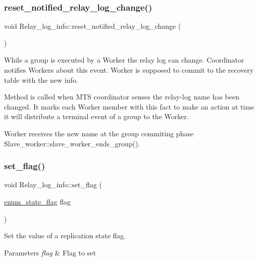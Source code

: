 \subsubsection{\texorpdfstring{reset\+\_\+notified\+\_\+relay\+\_\+log\+\_\+change()}{reset\_notified\_relay\_log\_change()}}
{\footnotesize\ttfamily void Relay\+\_\+log\+\_\+info\+::reset\+\_\+notified\+\_\+relay\+\_\+log\+\_\+change (\begin{DoxyParamCaption}{ }\end{DoxyParamCaption})}

While a group is executed by a Worker the relay log can change. Coordinator notifies Workers about this event. Worker is supposed to commit to the recovery table with the new info.

Method is called when M\+TS coordinator senses the relay-\/log name has been changed. It marks each Worker member with this fact to make an action at time it will distribute a terminal event of a group to the Worker.

Worker receives the new name at the group commiting phase {\ttfamily Slave\+\_\+worker\+::slave\+\_\+worker\+\_\+ends\+\_\+group()}. \mbox{\label{classRelay__log__info_a54a7597da74aeb539c944d54b16bf261}} 
\subsubsection{\texorpdfstring{set\+\_\+flag()}{set\_flag()}}
{\footnotesize\ttfamily void Relay\+\_\+log\+\_\+info\+::set\+\_\+flag (\begin{DoxyParamCaption}\item[{\mbox{\hyperlink{classRelay__log__info_a768d1f6426a20be0e32d7380a231c0b2}{enum\+\_\+state\+\_\+flag}}}]{flag }\end{DoxyParamCaption})\hspace{0.3cm}{\ttfamily [inline]}}

Set the value of a replication state flag.


\begin{DoxyParams}{Parameters}
{\em flag} & Flag to set \\
\hline
\end{DoxyParams}
\mbox{\label{classRelay__log__info_a41736eb133d061e07653c5207d6913e0}} 
